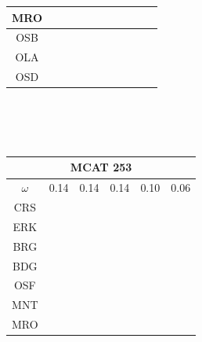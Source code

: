 \documentclass[12pt]{article}
\begin{document}
\begin{landscape}
\begin{figure}
{\begin{minipage}[c]{0.3\textwidth}
\begin{tabular}{|c|c|c|c|c|c|c|c|c|c|c|}
        MRO&\cellcolor[HTML]{984EA3}&\cellcolor[HTML]{984EA3}&\cellcolor[HTML]{984EA3}&\cellcolor[HTML]{984EA3}&\cellcolor[HTML]{984EA3}\\ \hline %
        OSB&\cellcolor[HTML]{FF7F00}&\cellcolor[HTML]{FF7F00}&\cellcolor[HTML]{FF7F00}&\cellcolor[HTML]{FF7F00}&\cellcolor[HTML]{FF7F00}\\ \hline %
        OLA&\cellcolor[HTML]{FF7F00}&\cellcolor[HTML]{FFFF33}&\cellcolor[HTML]{FF7F00}&\cellcolor[HTML]{FFFF33}&\cellcolor[HTML]{FF7F00}\\ \hline %
        OSD&\cellcolor[HTML]{FF7F00}&\cellcolor[HTML]{FFFF33}&\cellcolor[HTML]{FFFF33}&\cellcolor[HTML]{A65628}&\cellcolor[HTML]{FFFF33}\\ \hline %
\end{tabular}\\$~$\\$~$\\
\hspace*{-5cm}
\begin{tabular}{|c|c|c|c|c|c|} %
         \hline \multicolumn{6}{|c|}{MCAT 253} \\ \hline
         $\omega$&0.14&0.14&0.14&0.10&0.06 \\ \hline %
        CRS&\cellcolor[HTML]{E41A1C}&\cellcolor[HTML]{E41A1C}&\cellcolor[HTML]{E41A1C}&\cellcolor[HTML]{E41A1C}&\cellcolor[HTML]{E41A1C}\\ \hline %
        ERK&\cellcolor[HTML]{377EB8}&\cellcolor[HTML]{E41A1C}&\cellcolor[HTML]{E41A1C}&\cellcolor[HTML]{E41A1C}&\cellcolor[HTML]{377EB8}\\ \hline %
        BRG&\cellcolor[HTML]{4DAF4A}&\cellcolor[HTML]{377EB8}&\cellcolor[HTML]{377EB8}&\cellcolor[HTML]{377EB8}&\cellcolor[HTML]{4DAF4A}\\ \hline %
        BDG&\cellcolor[HTML]{4DAF4A}&\cellcolor[HTML]{377EB8}&\cellcolor[HTML]{377EB8}&\cellcolor[HTML]{377EB8}&\cellcolor[HTML]{4DAF4A}\\ \hline %
        OSF&\cellcolor[HTML]{984EA3}&\cellcolor[HTML]{4DAF4A}&\cellcolor[HTML]{4DAF4A}&\cellcolor[HTML]{4DAF4A}&\cellcolor[HTML]{984EA3}\\ \hline %
        MNT&\cellcolor[HTML]{984EA3}&\cellcolor[HTML]{4DAF4A}&\cellcolor[HTML]{4DAF4A}&\cellcolor[HTML]{4DAF4A}&\cellcolor[HTML]{984EA3}\\ \hline %
        MRO&\cellcolor[HTML]{984EA3}&\cellcolor[HTML]{4DAF4A}&\cellcolor[HTML]{4DAF4A}&\cellcolor[HTML]{4DAF4A}&\cellcolor[HTML]{984EA3}\\ \hline %

\end{tabular}
\end{minipage}}
\end{figure}
\end{landscape}
\end{document}
